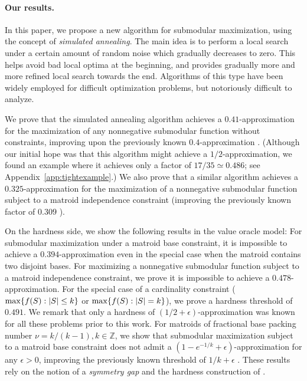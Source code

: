 \documentclass{article}[11pt]
\def\ZZ{{\mathbb Z}}
\def\max{{\rm{max}}}
\begin{document}
\paragraph{Our results.}
In this paper, we propose a new algorithm for submodular maximization, using
the concept of {\em simulated annealing}. The main idea is to perform a local search
under a certain amount of random noise which gradually decreases to zero.
This helps avoid bad local optima at the beginning,
and provides gradually more and more refined local search towards the end.
Algorithms of this type have been widely employed for difficult optimization problems,
but notoriously difficult to analyze.

We prove that the simulated annealing algorithm achieves a $0.41$-approximation for the maximization
of any nonnegative submodular function without constraints, improving upon the previously known
$0.4$-approximation \cite{FMV07}. (Although our initial hope was that this algorithm
might achieve a $1/2$-approximation, we found an example where it
achieves only a factor of $17/35 \simeq 0.486$; see Appendix~\ref{app:tightexample}.)
We also prove that a similar algorithm achieves a $0.325$-approximation for the
maximization of a nonnegative submodular function subject to a matroid independence
constraint (improving the previously known factor of $0.309$ \cite{Vondrak09}).

On the hardness side, we show the following results in the value oracle model:
For submodular maximization under a matroid base constraint, 
it is impossible to achieve a $0.394$-approximation even in the special case
when the matroid contains two disjoint bases.
For maximizing a nonnegative submodular function subject to a matroid independence constraint,
we prove it is impossible to achieve a $0.478$-approximation.
For the special case of a cardinality constraint ($\max \{f(S): |S| \leq k\}$
or $\max \{f(S): |S|=k\}$), we prove a hardness threshold of $0.491$.
We remark that only a hardness
of $(1/2+\epsilon)$-approximation was known for all these problems prior to this work.
For matroids of fractional base packing number $\nu = k/(k-1), k \in \ZZ$,
we show that submodular maximization subject to a matroid base constraint
does not admit a $(1-e^{-1/k}+\epsilon)$-approximation for any $\epsilon>0$,
improving the previously known threshold of $1/k+\epsilon$ \cite{Vondrak09}. 
These results rely on the notion of a {\em symmetry gap} and the hardness construction of
\cite{Vondrak09}.
\end{document}
